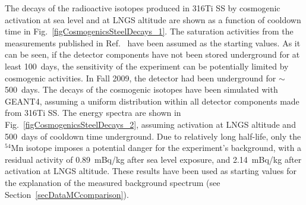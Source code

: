
The decays of the radioactive isotopes produced in 316Ti SS by cosmogenic activation at sea level and at LNGS altitude are shown as a function of cooldown time in Fig.~\ref{figCosmogenicsSteelDecays_1}. The saturation activities from the measurements published in Ref.~\cite{SteelCosmogenics} have been assumed as the starting values. As it can be seen, if the detector components have not been stored underground for at least 100~days, the sensitivity of the experiment can be potentially limited by cosmogenic activities. 
In Fall 2009, the detector had been underground for $\sim$500~days. The decays of the cosmogenic isotopes have been simulated with GEANT4, assuming a uniform distribution within all detector components made from 316Ti SS. The energy spectra are shown in Fig.~\ref{figCosmogenicsSteelDecays_2}, assuming activation at LNGS altitude and 500~days of cooldown time underground. Due to relatively long half-life, only the $^{54}$Mn isotope imposes a potential danger for the experiment's  background, with a residual activity of 0.89~mBq/kg after sea level exposure, and 2.14~mBq/kg after activation at LNGS altitude. These results have been used as starting values for the explanation of the measured background spectrum (see Section~\ref{secDataMCcomparison}).


